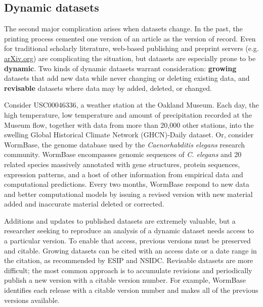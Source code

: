 \documentclass[10pt,a4paper,twocolumn]{article}
\begin{document}
{{\subsection*{Dynamic datasets}\label{dynamic-data}

The second major complication arises when datasets change.
In the past, the printing process cemented one version of an article as the version of record.
Even for traditional scholarly literature, web-based publishing and preprint servers (e.g. \href{http://arxiv.org/}{arXiv.org}) are complicating the situation, but datasets are especially prone to be \textbf{dynamic}.
Two kinds of dynamic datasets warrant consideration: \textbf{growing} datasets that add new data while never changing or deleting existing data, and \textbf{revisable} datasets where data may by added, deleted, or changed.

Consider USC00046336, a weather station at the Oakland Museum.
Each day, the high temperature, low temperature and amount of precipitation recorded at the Museum \cite{global_historical_climate_data_network_daily_????} flow, together with data from more than 20,000 other stations, into the swelling Global Historical Climate Network (GHCN)-Daily\cite{menne_overview_2012} dataset.
Or, consider WormBase, the genome database used by the \textit{Caenorhabditis elegans} research community.
WormBase encompasses genomic sequences of \emph{C. elegans} and 20 related species massively annotated with gene structures, protein sequences, expression patterns, and a host of other information from empirical data and computational predictions.
Every two months, WormBase respond to new data and better computational models by issuing a revised version with new material added and inaccurate material deleted or corrected.

Additions and updates to published datasets are extremely valuable, but a researcher seeking to reproduce an analysis of a dynamic dataset needs access to a particular version.
To enable that access, previous versions must be preserved and citable.
Growing datasets can be cited with an access date or a date range in the citation, as recommended by ESIP and NSIDC.
Revisable datasets are more difficult; the most common approach is to accumulate revisions and periodically publish a new version with a citable version number.
For example, WormBase identifies each release with a citable version number and makes all of the previous versions available.

}}
\end{document}
